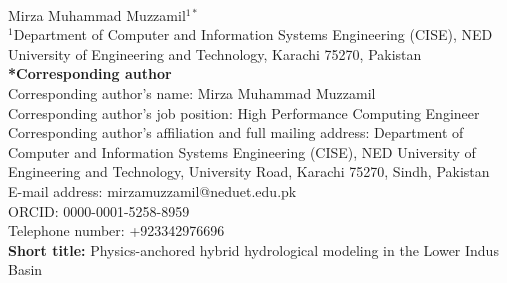 \documentclass[11pt,a4paper,fleqn]{article}
\begin{document}
\pagestyle{plain}
\thispagestyle{plain}


\begin{singlespace}
\\[1.5em]

\noindent Mirza Muhammad Muzzamil$^{1*}$\\[0.8em]

\noindent $^1$Department of Computer and Information Systems Engineering (CISE), NED University of Engineering and Technology, Karachi 75270, Pakistan\\[1.2em]

\noindent \textbf{*Corresponding author}\\
\noindent Corresponding author's name: Mirza Muhammad Muzzamil\\
\noindent Corresponding author's job position: High Performance Computing Engineer\\
\noindent Corresponding author's affiliation and full mailing address: Department of Computer and Information Systems Engineering (CISE), NED University of Engineering and Technology, University Road, Karachi 75270, Sindh, Pakistan\\
\noindent E-mail address: mirzamuzzamil@neduet.edu.pk\\
\noindent ORCID: 0000-0001-5258-8959\\
\noindent Telephone number: +923342976696\\[1.2em]

\noindent \textbf{Short title:} Physics-anchored hybrid hydrological modeling in the Lower Indus Basin\\[1.5em]


\end{singlespace}
\end{document}
